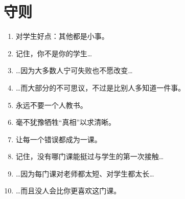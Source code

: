 \chapter*{守则}

\begin{enumerate}

\item 对学生好点：其他都是小事。\\

\item 记住，你不是你的学生{\ldots}\\

\item {\ldots}因为大多数人宁可失败也不愿改变{\ldots}\\

\item {\ldots}而大部分的不可思议，不过是比别人多知道一件事。\\

\item 永远不要一个人教书。\\

\item 毫不犹豫牺牲“真相”以求清晰。\\

\item 让每一个错误都成为一课。\\

\item 记住，没有哪门课能挺过与学生的第一次接触{\ldots}\\

\item {\ldots}因为每门课对老师都太短、对学生都太长{\ldots}\\

\item {\ldots}而且没人会比你更喜欢这门课。

\end{enumerate}
